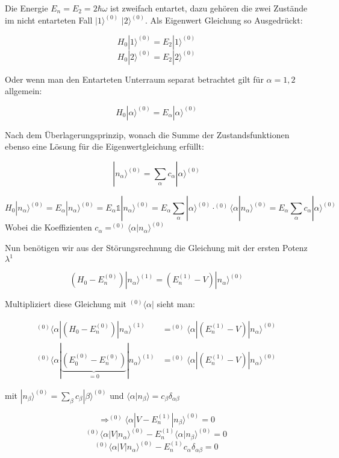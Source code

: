 Die Energie \(E_n = E_2 = 2\hbar\omega\) ist zweifach entartet, dazu gehören die zwei Zustände im nicht entarteten Fall \(|1\rangle^{(0)} \)  \(|2\rangle^{(0)} \). Als Eigenwert Gleichung so Ausgedrückt:

\[H_0 |1\rangle^{(0)} = E_2 |1\rangle^{(0)} \]
\[H_0 |2\rangle^{(0)} = E_2 |2\rangle^{(0)} \]

Oder wenn man den Entarteten Unterraum separat betrachtet gilt für \(\alpha=1,2\) allgemein:

\[H_0 |\alpha\rangle^{(0)} = E_\alpha |\alpha\rangle^{(0)} \]

Nach dem Überlagerungsprinzip, wonach die Summe der Zustandsfunktionen ebenso eine Lösung für die Eigenwertgleichung erfüllt:

\[|n_\alpha\rangle^{(0)} = \sum_\alpha c_\alpha |\alpha\rangle ^{(0)}\]

\[H_0 |n_\alpha \rangle^{(0)} = E_\alpha |n_\alpha\rangle^{(0)} = E_\alpha \mathbb 1 |n_\alpha\rangle^{(0)} =  E_\alpha \sum_\alpha |\alpha\rangle^{(0)} \cdot^{(0)}\langle \alpha |n_\alpha\rangle^{(0)} = E_\alpha \sum_\alpha c_\alpha|\alpha\rangle ^{(0)} \]
Wobei die Koeffizienten \(c_\alpha =  ^{(0)} \langle \alpha |n_\alpha\rangle^{(0)}\)

Nun benötigen wir aus der Störungsrechnung die Gleichung mit der ersten Potenz \(\lambda^1\)

\[(H_0-E_n^{(0)})|n_\alpha\rangle ^{(1)} = (E_n^{(1)}-V)|n_\alpha\rangle^{(0)}\]

Multipliziert diese Gleichung mit \(^{(0)}\langle \alpha|\) sieht man:

\begin{align}
^{(0)}\langle \alpha|(H_0-E_n^{(0)})|n_\alpha\rangle ^{(1)} &= ^{(0)}\langle \alpha|(E_n^{(1)}-V)|n_\alpha\rangle^{(0)}\\
^{(0)}\langle \alpha|\underbrace{(E_0^{(0)}-E_n^{(0)})}_{=0}|n_\alpha\rangle ^{(1)} &=^{(0)}\langle \alpha| (E_n^{(1)}-V)|n_\alpha\rangle^{(0)}
\end{align}

mit \(|n_\beta \rangle^{(0)} = \sum_\beta c_\beta |\beta\rangle ^{(0)} \) und \(\langle \alpha|n_\beta\rangle = c_\beta\delta_{\alpha\beta}\)

\[\Rightarrow  ^{(0)} \langle \alpha|V-E_n^{(1)}|n_\beta\rangle^{(0)} = 0 \]
\[  ^{(0)} \langle \alpha|V|n_\alpha\rangle^{(0)} -E_n^{(1)} \langle \alpha|n_\beta\rangle^{(0)}  = 0 \]
\[  ^{(0)} \langle \alpha|V|n_\alpha\rangle^{(0)} -E_n^{(1)} c_\alpha  \delta_{\alpha\beta}  = 0 \]


